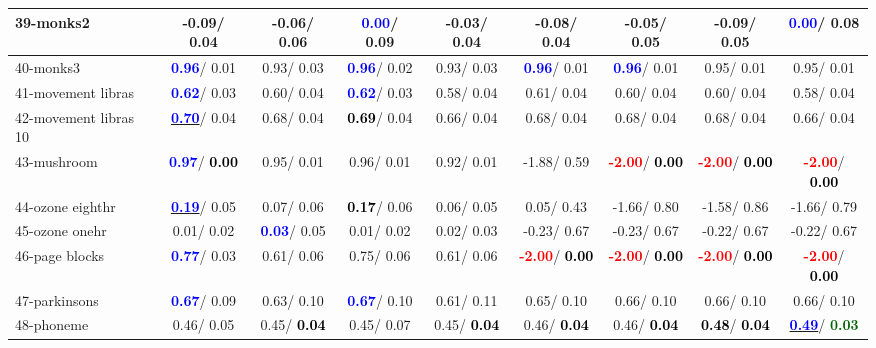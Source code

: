 \begin{table}[h]
\begin{center}
\begin{tabular}{lc|c|c|c|c|c|c|c}
39-monks2 &  -0.09/  0.04 &  -0.06/  0.06 & \textcolor{blue}{\textbf{  0.00}}/  0.09 &  -0.03/  0.04 &  -0.08/  0.04 &  -0.05/  0.05 &  -0.09/  0.05 & \textcolor{blue}{\textbf{  0.00}}/  0.08 \\ \hline
40-monks3 & \textcolor{blue}{\textbf{  0.96}}/  0.01 &   0.93/  0.03 & \textcolor{blue}{\textbf{  0.96}}/  0.02 &   0.93/  0.03 & \textcolor{blue}{\textbf{  0.96}}/  0.01 & \textcolor{blue}{\textbf{  0.96}}/  0.01 &   0.95/  0.01 &   0.95/  0.01 \\
41-movement libras & \textcolor{blue}{\textbf{  0.62}}/  0.03 &   0.60/  0.04 & \textcolor{blue}{\textbf{  0.62}}/  0.03 &   0.58/  0.04 &   0.61/  0.04 &   0.60/  0.04 &   0.60/  0.04 &   0.58/  0.04 \\
42-movement libras 10 & \underline{\textcolor{blue}{\textbf{  0.70}}}/  0.04 &   0.68/  0.04 & \textcolor{black}{\textbf{  0.69}}/  0.04 &   0.66/  0.04 &   0.68/  0.04 &   0.68/  0.04 &   0.68/  0.04 &   0.66/  0.04 \\
43-mushroom & \textcolor{blue}{\textbf{  0.97}}/\textcolor{black}{\textbf{  0.00}} &   0.95/  0.01 &   0.96/  0.01 &   0.92/  0.01 &  -1.88/  0.59 & \textcolor{red}{\textbf{ -2.00}}/\textcolor{black}{\textbf{  0.00}} & \textcolor{red}{\textbf{ -2.00}}/\textcolor{black}{\textbf{  0.00}} & \textcolor{red}{\textbf{ -2.00}}/\textcolor{black}{\textbf{  0.00}} \\
44-ozone eighthr & \underline{\textcolor{blue}{\textbf{  0.19}}}/  0.05 &   0.07/  0.06 & \textcolor{black}{\textbf{  0.17}}/  0.06 &   0.06/  0.05 &   0.05/  0.43 &  -1.66/  0.80 &  -1.58/  0.86 &  -1.66/  0.79 \\
45-ozone onehr &   0.01/  0.02 & \textcolor{blue}{\textbf{  0.03}}/  0.05 &   0.01/  0.02 &   0.02/  0.03 &  -0.23/  0.67 &  -0.23/  0.67 &  -0.22/  0.67 &  -0.22/  0.67 \\
46-page blocks & \textcolor{blue}{\textbf{  0.77}}/  0.03 &   0.61/  0.06 &   0.75/  0.06 &   0.61/  0.06 & \textcolor{red}{\textbf{ -2.00}}/\textcolor{black}{\textbf{  0.00}} & \textcolor{red}{\textbf{ -2.00}}/\textcolor{black}{\textbf{  0.00}} & \textcolor{red}{\textbf{ -2.00}}/\textcolor{black}{\textbf{  0.00}} & \textcolor{red}{\textbf{ -2.00}}/\textcolor{black}{\textbf{  0.00}} \\ \hline
47-parkinsons & \textcolor{blue}{\textbf{  0.67}}/  0.09 &   0.63/  0.10 & \textcolor{blue}{\textbf{  0.67}}/  0.10 &   0.61/  0.11 &   0.65/  0.10 &   0.66/  0.10 &   0.66/  0.10 &   0.66/  0.10 \\
48-phoneme &   0.46/  0.05 &   0.45/\textcolor{black}{\textbf{  0.04}} &   0.45/  0.07 &   0.45/\textcolor{black}{\textbf{  0.04}} &   0.46/\textcolor{black}{\textbf{  0.04}} &   0.46/\textcolor{black}{\textbf{  0.04}} & \textcolor{black}{\textbf{  0.48}}/\textcolor{black}{\textbf{  0.04}} & \underline{\textcolor{blue}{\textbf{  0.49}}}/\textcolor{darkgreen}{\textbf{  0.03}} \\

\end{tabular}
\end{center}
\end{table}
